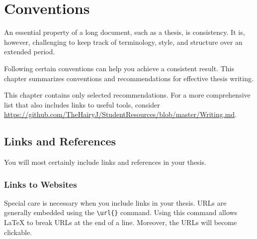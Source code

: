 
\chapter{Conventions} %

\label{Chapter2} %


\renewcommand{\keyword}[1]{\textbf{#1}}
\renewcommand{\tabhead}[1]{\textbf{#1}}
\renewcommand{\code}[1]{\texttt{#1}}
\renewcommand{\file}[1]{\texttt{#1}}
\renewcommand{\option}[1]{\texttt{\itshape#1}}




An essential property of a long document, such as a thesis, is consistency.%
It is, however, challenging to keep track of terminology, style, and structure over an extended period.

Following certain conventions can help you achieve a consistent result. This chapter summarizes conventions and recommendations for effective thesis writing.

This%
 chapter contains only selected recommendations. For a more comprehensive list that also includes links to useful tools, consider \url{https://github.com/TheHairyJ/StudentResources/blob/master/Writing.md}.

\section{Links and References}

You will most certainly include links and references in your thesis.

\subsection{Links to Websites}

Special care is necessary when you include links in your thesis. URLs are generally embedded using the \verb|\url{}| command. Using this command allows LaTeX to break URLs at the end of a line. Moreover, the URLs will become clickable.

